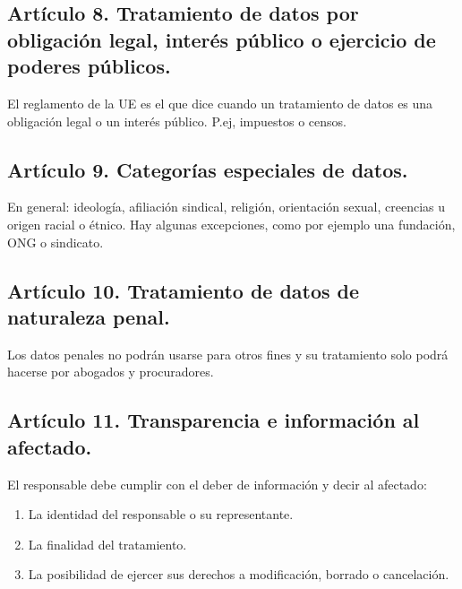 \documentclass[letterpaper,10pt,spanish]{sphinxmanual}
\begin{document}
\subsection{Artículo 8. Tratamiento de datos por obligación legal, interés público o ejercicio de poderes públicos.}
\label{\detokenize{tema_lopd/tema_lopd:articulo-8-tratamiento-de-datos-por-obligacion-legal-interes-publico-o-ejercicio-de-poderes-publicos}}
El reglamento de la UE es el que dice cuando un tratamiento de datos es una obligación legal o un interés público. P.ej, impuestos o censos.


\subsection{Artículo 9. Categorías especiales de datos.}
\label{\detokenize{tema_lopd/tema_lopd:articulo-9-categorias-especiales-de-datos}}
En general: ideología, afiliación sindical, religión, orientación sexual, creencias u origen racial o étnico. Hay algunas excepciones, como por ejemplo una fundación, ONG o sindicato.


\subsection{Artículo 10. Tratamiento de datos de naturaleza penal.}
\label{\detokenize{tema_lopd/tema_lopd:articulo-10-tratamiento-de-datos-de-naturaleza-penal}}
Los datos penales no podrán usarse para otros fines y su tratamiento solo podrá hacerse por abogados y procuradores.


\subsection{Artículo 11. Transparencia e información al afectado.}
\label{\detokenize{tema_lopd/tema_lopd:articulo-11-transparencia-e-informacion-al-afectado}}
El responsable debe cumplir con el deber de información y decir al afectado:
\begin{enumerate}
\def\theenumi{\arabic{enumi}}
\def\labelenumi{\theenumi .}
\makeatletter\def\p@enumii{\p@enumi \theenumi .}\makeatother
\item {} 
La identidad del responsable o su representante.

\item {} 
La finalidad del tratamiento.

\item {} 
La posibilidad de ejercer sus derechos a modificación, borrado o cancelación.

\end{enumerate}
\end{document}
